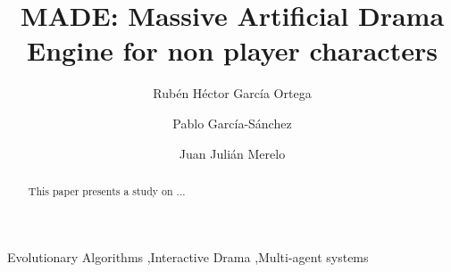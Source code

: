 \documentclass[final,1p,times]{elsarticle}
\begin{document}
\begin{frontmatter}



\title{MADE: Massive Artificial Drama Engine for non player characters}

\author[fidesol]{Rub\'en H\'ector Garc\'ia Ortega} %
\author[ugr]{Pablo Garc\'ia-S\'anchez}
\author[ugr]{Juan Juli\'an Merelo}

\address[fidesol]{Fundaci\'on I+D del Software Libre, Granada, Spain} %
\address[ugr]{Department of Computer Architecture and Computer
  Technology and CITIC-UGR, University of Granada, Granada,
  Spain. Tel: +34958241778. Fax: +34958248993} %



\begin{abstract}
This paper presents a study on ...


\end{abstract}

\begin{keyword}
Evolutionary Algorithms \sep Interactive Drama \sep Multi-agent systems%
\end{keyword}

\end{frontmatter}
\end{document}
